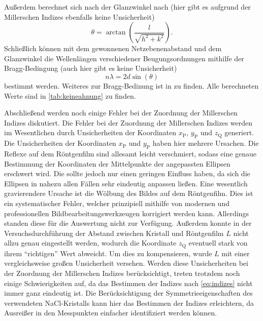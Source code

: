 Außerdem berechnet sich nach \cite{laue_handblatt} der Glanzwinkel nach (hier gibt es aufgrund der Millerschen Indizes ebenfalls keine Unsicherheit)
\begin{equation*}
    \theta = \arctan(\frac{l}{\sqrt{h^2 + k^2}}) .
\end{equation*} Schließlich können mit dem gewonnenen Netzebenenabstand und dem Glanzwinkel die Wellenlängen verschiedener Beugungsordnungen mithilfe
der Bragg-Bedingung (auch hier gibt es keine Unsicherheit)
\begin{equation*}
    n \lambda = 2d \sin(\theta)
\end{equation*} bestimmt werden. Weiteres zur Bragg-Bedinung ist in \cite{demtröder} zu finden. Alle berechneten Werte sind in \cref{tab:keineahnung} zu finden.\par
Abschließend werden noch einige Fehler bei der Zuordnung der Millerschen Indizes diskutiert. Die Fehler bei der Zuordnung der Millerschen Indizes werden im Wesentlichen durch
Unsicherheiten der Koordinaten $x_{\mathrm{P}}$, $y_{\mathrm{P}}$ und $z_{\mathrm{Q}}$ generiert. Die Unsicherheiten der Koordinaten $x_{\mathrm{P}}$ und $y_{\mathrm{P}}$
haben hier mehrere Ursachen. Die Reflexe auf dem Röntgenfilm sind allesamt leicht verschmiert, sodass eine genaue Bestimmung der Koordinaten der Mittelpunkte
der angepassten Ellipsen erschwert wird. Die sollte jedoch nur einen geringen Einfluss haben, da sich die Ellipsen in nahezu allen Fällen sehr eindeutig anpassen ließen.
Eine wesentlich gravierendere Ursache ist die Wölbung des Bildes auf dem Röntgenfilm. Dies ist ein systematischer Fehler, welcher prinzipiell mithilfe von modernen
und professionellen Bildbearbeitungswerkzeugen korrigiert werden kann. Allerdings standen diese für die Auswertung nicht zur Verfügung.
Außerdem konnte in der Versuchsdurchführung der Abstand zwischen Kristall und Röntgenfilm $L$ nicht allzu genau eingestellt werden, wodurch
die Koordinate $z_{\mathrm{Q}}$ eventuell stark von ihrem \enquote{richtigen} Wert abweicht. Um dies zu kompensieren, wurde $L$ mit
einer vergleichsweise großen Unsicherheit versehen. Werden diese Unsicherheiten bei
der Zuordnung der Millerschen Indizes berücksichtigt, treten trotzdem noch einige Schwierigkeiten auf, da das Bestimmen der Indizes nach \cref{eq:indizes} nicht immer ganz eindeutig
ist. Die Berücksichtigung der Symmetrieeigenschaften des verwendeten NaCl-Kristalls kann hier das Bestimmen der Indizes erleichtern, da Ausreißer in den Messpunkten
einfacher identifiziert werden können.
